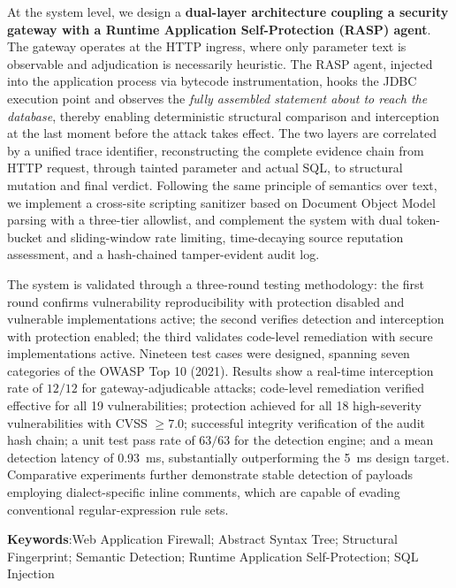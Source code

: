 At the system level, we design a \textbf{dual-layer architecture coupling a security
gateway with a Runtime Application Self-Protection (RASP) agent}. The gateway
operates at the HTTP ingress, where only parameter text is observable and adjudication
is necessarily heuristic. The RASP agent, injected into the application process via
bytecode instrumentation, hooks the JDBC execution point and observes the
\emph{fully assembled statement about to reach the database}, thereby enabling
deterministic structural comparison and interception at the last moment before the
attack takes effect. The two layers are correlated by a unified trace identifier,
reconstructing the complete evidence chain from HTTP request, through tainted
parameter and actual SQL, to structural mutation and final verdict. Following the
same principle of semantics over text, we implement a cross-site scripting
sanitizer based on Document Object Model parsing with a three-tier allowlist, and
complement the system with dual token-bucket and sliding-window rate limiting,
time-decaying source reputation assessment, and a hash-chained tamper-evident audit log.

The system is validated through a three-round testing methodology: the first round
confirms vulnerability reproducibility with protection disabled and vulnerable
implementations active; the second verifies detection and interception with
protection enabled; the third validates code-level remediation with secure
implementations active. Nineteen test cases were designed, spanning seven categories
of the OWASP Top 10 (2021). Results show a real-time interception rate of $12/12$
for gateway-adjudicable attacks; code-level remediation verified effective for all
19 vulnerabilities; protection achieved for all 18 high-severity vulnerabilities with
CVSS $\geq 7.0$; successful integrity verification of the audit hash chain; a unit
test pass rate of $63/63$ for the detection engine; and a mean detection latency of
0.93~ms, substantially outperforming the 5~ms design target. Comparative experiments
further demonstrate stable detection of payloads employing dialect-specific inline
comments, which are capable of evading conventional regular-expression rule sets.

\vspace{1.2em}
\noindent\textbf{Keywords}:\quad Web Application Firewall; Abstract Syntax Tree;
Structural Fingerprint; Semantic Detection; Runtime Application Self-Protection;
SQL Injection

